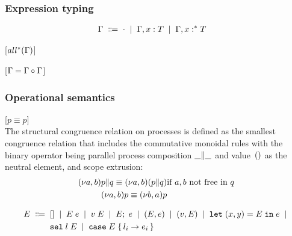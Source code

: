 \subsubsection{Expression typing}

\begin{align*}
  \Ctxt \grmdef&
    \CNil \grmor \Ctxt, \CBind x T \grmor \Ctxt, \CBind* x T
\end{align*}

[$\CExhausted$]

[$\Ctxt = \CSplit[\Ctxt][\Ctxt]$]




\subsubsection{Operational semantics}

[$p \equiv p$]\medskip\\
The structural congruence relation on processes is defined as the smallest
congruence relation that includes the commutative monoidal rules with the
binary operator being parallel process composition $\PPar \_ \_$ and
value~$()$ as the neutral element, and scope extrusion:
\begin{align*}
  \PPar{\PScope p}{q} \equiv \PScope (\PPar p q)
  &
  \text{if $a,b$ not free in $q$}
  \\
  \PScope p \equiv \PScope[b,a] p
\end{align*}

\begin{align*}
  E \; \Coloneqq \;\;&
    [] \; \mid \;
    E \; e \; \mid \;
    v \; E \; \mid \;
    E;\; e \; \mid \;
    (E,e) \; \mid \;
    (v,E) \; \mid \;
    \mathtt{let}\; (x,y) = E \;\mathtt{in}\; e \; \mid \;
  \\ &
    \mathtt{sel}\; l \; E \; \mid \; 
    \mathtt{case}\; E \; \{\,  l_i \rightarrow e_i  \,\}
\end{align*}



